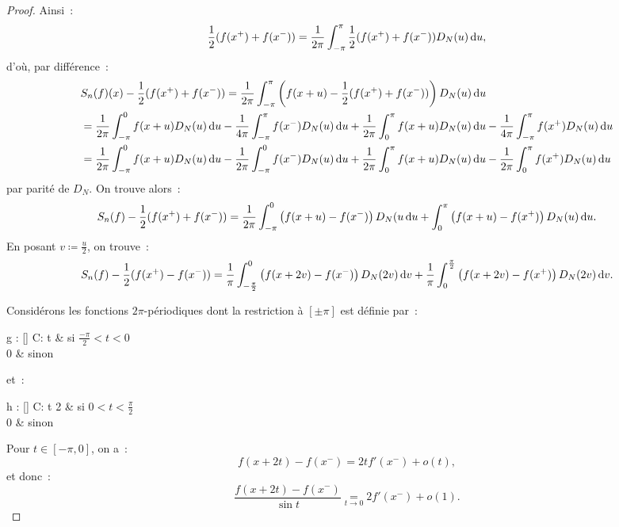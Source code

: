 \documentclass{report}
\theoremstyle{definition}
\theoremstyle{remark}
\numberwithin{equation}{section}
\newcommand{\C}{\mathbb C}
\begin{document}
\begin{proof}
			Ainsi~:
			\begin{equation}
				\frac 12(f(x^+) + f(x^-)) = \frac 1{2\pi}\int_{-\pi}^\pi\frac 12(f(x^+) + f(x^-))D_N(u)\dif u,
			\end{equation}
			d'où, par différence~:
			\begin{align}
				&S_n(f)(x) - \frac 12(f(x^+) + f(x^-)) = \frac 1{2\pi}\int_{-\pi}^\pi\left(f(x+u) - \frac 12(f(x^+)+f(x^-))\right)D_N(u)\dif u \\
				&= \frac 1{2\pi}\int_{-\pi}^0f(x+u)D_N(u)\dif u - \frac 1{4\pi}\int_{-\pi}^\pi f(x^-)D_N(u)\dif u + \frac 1{2\pi}\int_0^\pi f(x+u)D_N(u)\dif u - \frac 1{4\pi}\int_{-\pi}^\pi f(x^+)D_N(u)\dif u \\
				&= \frac 1{2\pi}\int_{-\pi}^0f(x+u)D_N(u)\dif u - \frac 1{2\pi}\int_{-\pi}^0 f(x^-)D_N(u)\dif u + \frac 1{2\pi}\int_0^\pi f(x+u)D_N(u)\dif u - \frac 1{2\pi}\int_0^\pi f(x^+)D_N(u)\dif u
			\end{align}
			par parité de $D_N$. On trouve alors~:
			\begin{equation}
				S_n(f) - \frac 12(f(x^+)+f(x^-)) = \frac 1{2\pi}\int_{-\pi}^0\left(f(x+u) - f(x^-)\right)D_N(u\dif u + \int_0^\pi\left(f(x+u) - f(x^+)\right)D_N(u)\dif u.
			\end{equation}
			En posant $v \coloneqq \frac u2$, on trouve~:
			\begin{equation}
				S_n(f) - \frac 12(f(x^+) - f(x^-)) = \frac 1\pi\int_{-\frac \pi2}^0\left(f(x+2v)-f(x^-)\right)D_N(2v)\dif v + \frac 1\pi\int_0^{\frac \pi2}\left(f(x+2v)-f(x^+)\right)D_N(2v)\dif v.
			\end{equation}

			Considérons les fonctions $2\pi$-périodiques dont la restriction à $[\pm \pi]$ est définie par~:
			\begin{subnumcases}
				{g : [\pm\pi] \to \C : t \mapsto}
					 & si $\frac {-\pi}2 < t < 0$ \\
					0 & sinon
			\end{subnumcases}
			et~:
			\begin{subnumcases}
				{h : [\pm\pi] \to \C : t \mapsto}
					2 & si $0 < t < \frac \pi2$ \\
					0 & sinon
			\end{subnumcases}

			Pour $t \in [-\pi, 0]$, on a~:
			\begin{equation}
				f(x+2t) - f(x^-) = 2tf'(x^-) + o(t),
			\end{equation}
			et donc~:
			\begin{equation}
				\frac {f(x+2t) - f(x^-)}{\sin t} \underset {t \to 0}= 2f'(x^-) + o(1).
			\end{equation}


\end{proof}
\end{document}
